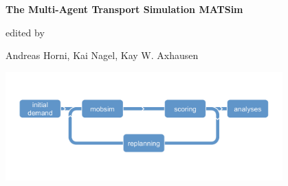 \thispagestyle{plainstyle}
\begin{center}
      \bigskip
      
      \bigskip

      \bigskip
      
		
      {\textbf{\Large{The Multi-Agent Transport Simulation MATSim}}}

      \bigskip

      \bigskip
      
      \bigskip

      edited by

      Andreas Horni, Kai Nagel, Kay W. Axhausen

      \bigskip

      \bigskip
      
      \bigskip
      
      \includegraphics[width=0.8\textwidth]{figures/matsimcycle}
			
    \end{center}
		
		
			\vskip 10cm

%
%

